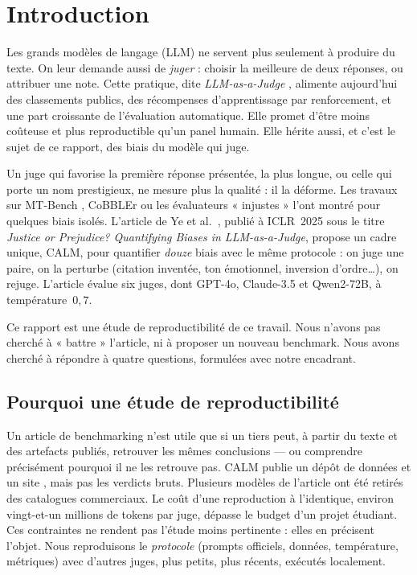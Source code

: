 \chapter{Introduction}
\label{chap-intro}

Les grands modèles de langage (LLM) ne servent plus seulement à produire du texte. On leur demande aussi de \emph{juger} : choisir la meilleure de deux réponses, ou attribuer une note. Cette pratique, dite \emph{LLM-as-a-Judge} \cite{zheng2023mtbench,liu2023geval}, alimente aujourd'hui des classements publics, des récompenses d'apprentissage par renforcement, et une part croissante de l'évaluation automatique. Elle promet d'être moins coûteuse et plus reproductible qu'un panel humain. Elle hérite aussi, et c'est le sujet de ce rapport, des biais du modèle qui juge.

Un juge qui favorise la première réponse présentée, la plus longue, ou celle qui porte un nom prestigieux, ne mesure plus la qualité : il la déforme. Les travaux sur MT-Bench \cite{zheng2023mtbench}, CoBBLEr \cite{koo2023cobbler} ou les évaluateurs « injustes » \cite{wang2024fair} l'ont montré pour quelques biais isolés. L'article de Ye et al.\ \cite{ye2025justice}, publié à ICLR~2025 sous le titre \emph{Justice or Prejudice? Quantifying Biases in LLM-as-a-Judge}, propose un cadre unique, CALM, pour quantifier \emph{douze} biais avec le même protocole : on juge une paire, on la perturbe (citation inventée, ton émotionnel, inversion d'ordre\ldots), on rejuge. L'article évalue six juges, dont GPT-4o, Claude-3.5 et Qwen2-72B, à température~$0{,}7$.

Ce rapport est une étude de reproductibilité de ce travail. Nous n'avons pas cherché à « battre » l'article, ni à proposer un nouveau benchmark. Nous avons cherché à répondre à quatre questions, formulées avec notre encadrant.

\section{Pourquoi une étude de reproductibilité}

Un article de benchmarking n'est utile que si un tiers peut, à partir du texte et des artefacts publiés, retrouver les mêmes conclusions --- ou comprendre précisément pourquoi il ne les retrouve pas. CALM publie un dépôt de données \cite{calmdataset} et un site \cite{calmwebsite}, mais pas les verdicts bruts. Plusieurs modèles de l'article ont été retirés des catalogues commerciaux. Le coût d'une reproduction à l'identique, environ vingt-et-un millions de tokens par juge, dépasse le budget d'un projet étudiant. Ces contraintes ne rendent pas l'étude moins pertinente : elles en précisent l'objet. Nous reproduisons le \emph{protocole} (prompts officiels, données, température, métriques) avec d'autres juges, plus petits, plus récents, exécutés localement.

